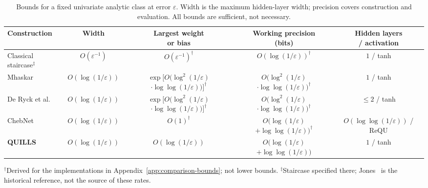 
\begin{table}[t]
\centering
\footnotesize
\setlength{\tabcolsep}{2pt}
\renewcommand{\arraystretch}{1.05}
\caption{Bounds for a fixed univariate analytic class at error $\varepsilon$.
Width is the maximum hidden-layer width; precision covers construction and
evaluation. All bounds are sufficient, not necessary.}
\label{tab:mlp-comparison}
\begin{tabular*}{\linewidth}{@{\extracolsep{\fill}}lcccc@{}}
\toprule
Construction & Width & \makecell{Largest weight\\or bias}
& \makecell{Working precision\\(bits)}
& \makecell{Hidden layers\\/ activation} \\
\midrule
Classical staircase$^{\ddagger}$
& $O(\varepsilon^{-1})$
& $O(\varepsilon^{-1})^{\dagger}$
& $O(\log(1/\varepsilon))^{\dagger}$
& $1$ / tanh \\
Mhaskar~\cite{mhaskar1996}
& $O(\log(1/\varepsilon))$
& \makecell{$\exp\!\big[O(\log^2(1/\varepsilon)$\\
            $\cdot\log\log(1/\varepsilon))\big]^{\dagger}$}
& \makecell{$O(\log^2(1/\varepsilon)$\\
            $\cdot\log\log(1/\varepsilon))^{\dagger}$}
& $1$ / tanh \\
De Ryck et al.~\cite{deryck2021}
& $O(\log(1/\varepsilon))$
& \makecell{$\exp\!\big[O(\log^2(1/\varepsilon)$\\
            $\cdot\log\log(1/\varepsilon))\big]^{\dagger}$}
& \makecell{$O(\log^2(1/\varepsilon)$\\
            $\cdot\log\log(1/\varepsilon))^{\dagger}$}
& $\le 2$ / tanh \\
ChebNet~\cite{tang2019chebnet}
& $O(\log(1/\varepsilon))$
& $O(1)^{\dagger}$
& \makecell{$O(\log(1/\varepsilon)$\\
            $+\log\log(1/\varepsilon))^{\dagger}$}
& \makecell{$O(\log\log(1/\varepsilon))$\\/ ReQU} \\
\textbf{QUILLS}
& $O(\log(1/\varepsilon))$
& $O(\log(1/\varepsilon))$
& \makecell{$O(\log(1/\varepsilon)$\\
            $+\log\log(1/\varepsilon))$}
& $1$ / tanh \\
\bottomrule
\end{tabular*}
\vspace{3pt}
\begin{minipage}{\linewidth}
\scriptsize
$^{\dagger}$Derived for the implementations in
Appendix~\ref{app:comparison-bounds}; not lower bounds.
$^{\ddagger}$Staircase specified there; Jones~\cite{jones1990}
is the historical reference, not the source of these rates.
\end{minipage}
\end{table}

